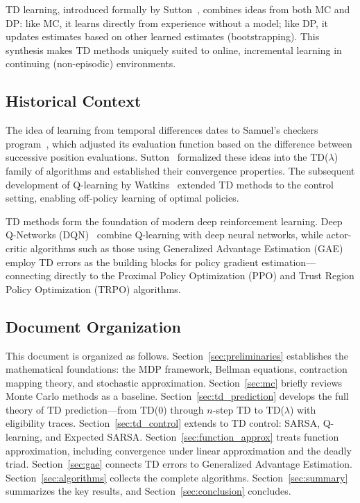 \documentclass[11pt,a4paper]{article}
\theoremstyle{definition}
\theoremstyle{plain}
\theoremstyle{remark}
\begin{document}
TD learning, introduced formally by Sutton~\cite{sutton1988}, combines ideas from both MC and DP: like MC, it learns directly from experience without a model; like DP, it updates estimates based on other learned estimates (bootstrapping). This synthesis makes TD methods uniquely suited to online, incremental learning in continuing (non-episodic) environments.

\subsection{Historical Context}
\label{subsec:history}

The idea of learning from temporal differences dates to Samuel's checkers program~\cite{samuel1959}, which adjusted its evaluation function based on the difference between successive position evaluations. Sutton~\cite{sutton1988} formalized these ideas into the TD($\lambda$) family of algorithms and established their convergence properties. The subsequent development of Q-learning by Watkins~\cite{watkins1989} extended TD methods to the control setting, enabling off-policy learning of optimal policies.

TD methods form the foundation of modern deep reinforcement learning. Deep Q-Networks (DQN)~\cite{mnih2015} combine Q-learning with deep neural networks, while actor-critic algorithms such as those using Generalized Advantage Estimation (GAE)~\cite{schulman2016} employ TD errors as the building blocks for policy gradient estimation---connecting directly to the Proximal Policy Optimization (PPO) and Trust Region Policy Optimization (TRPO) algorithms.

\subsection{Document Organization}
\label{subsec:organization}

This document is organized as follows. Section~\ref{sec:preliminaries} establishes the mathematical foundations: the MDP framework, Bellman equations, contraction mapping theory, and stochastic approximation. Section~\ref{sec:mc} briefly reviews Monte Carlo methods as a baseline. Section~\ref{sec:td_prediction} develops the full theory of TD prediction---from TD(0) through $n$-step TD to TD($\lambda$) with eligibility traces. Section~\ref{sec:td_control} extends to TD control: SARSA, Q-learning, and Expected SARSA. Section~\ref{sec:function_approx} treats function approximation, including convergence under linear approximation and the deadly triad. Section~\ref{sec:gae} connects TD errors to Generalized Advantage Estimation. Section~\ref{sec:algorithms} collects the complete algorithms. Section~\ref{sec:summary} summarizes the key results, and Section~\ref{sec:conclusion} concludes.
\end{document}

